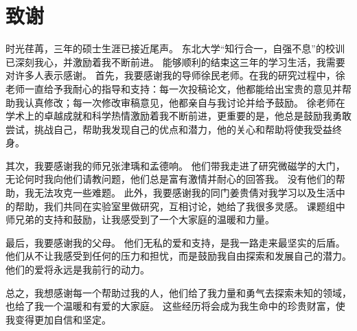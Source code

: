 \chapter*{致谢}
时光荏苒，三年的硕士生涯已接近尾声。
东北大学“知行合一，自强不息”的校训已深刻我心，并激励着我不断前进。
能够顺利的结束这三年的学习生活，我需要对许多人表示感谢。
首先，我要感谢我的导师徐民老师。在我的研究过程中，徐老师一直给予我耐心的指导和支持：每一次投稿论文，他都能给出宝贵的意见并帮助我认真修改；每一次修改审稿意见，他都亲自与我讨论并给予鼓励。
徐老师在学术上的卓越成就和科学热情激励着我不断前进，更重要的是，他总是鼓励我勇敢尝试，挑战自己，帮助我发现自己的优点和潜力，他的关心和帮助将使我受益终身。\par
其次，我要感谢我的师兄张津瑀和孟德响。
他们带我走进了研究微磁学的大门，无论何时我向他们请教问题，他们总是富有激情并耐心的回答我。
没有他们的帮助，我无法攻克一些难题。
此外，我要感谢我的同门姜贵倩对我学习以及生活中的帮助，我们共同在实验室里做研究，互相讨论，她给了我很多灵感。
课题组中师兄弟的支持和鼓励，让我感受到了一个大家庭的温暖和力量。\par
最后，我要感谢我的父母。
他们无私的爱和支持，是我一路走来最坚实的后盾。
他们从不让我感受到任何的压力和担忧，而是鼓励我自由探索和发展自己的潜力。
他们的爱将永远是我前行的动力。\par
总之，我想感谢每一个帮助过我的人，他们给了我力量和勇气去探索未知的领域，也给了我一个温暖和有爱的大家庭。
这些经历将会成为我生命中的珍贵财富，使我变得更加自信和坚定。
\newpage
\thispagestyle{empty} 